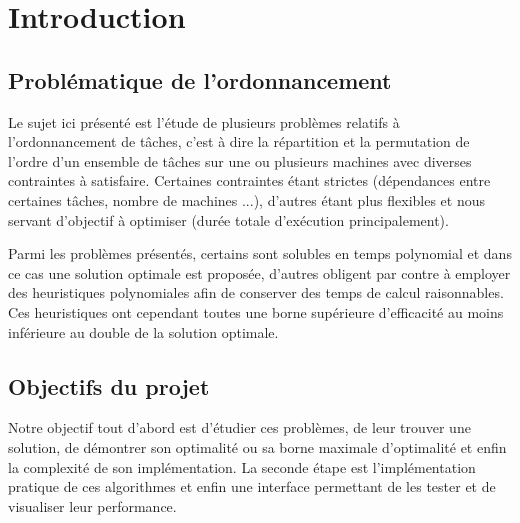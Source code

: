 \chapter{Introduction}
\section{Problématique de l'ordonnancement}
Le sujet ici présenté est l'étude de plusieurs problèmes relatifs à
l'ordonnancement de tâches, c'est à dire la répartition et la permutation de
l'ordre d'un ensemble de tâches sur une ou plusieurs machines avec diverses
contraintes à satisfaire. Certaines contraintes étant strictes (dépendances entre
certaines tâches, nombre de machines ...), d'autres étant plus flexibles et nous servant d'objectif à
optimiser (durée totale d'exécution principalement).

Parmi les problèmes
présentés, certains sont solubles en temps polynomial et dans ce cas une
solution optimale est proposée, d'autres obligent par contre à employer des heuristiques polynomiales afin de conserver des temps de calcul raisonnables. Ces heuristiques ont cependant toutes une borne supérieure d'efficacité au moins inférieure au double de la solution optimale.

\section{Objectifs du projet}
Notre objectif tout d'abord est d'étudier ces problèmes, de leur trouver une
solution, de démontrer son optimalité ou sa borne maximale d'optimalité et enfin
la complexité de son implémentation. La seconde étape est l'implémentation
pratique de ces algorithmes et enfin une interface permettant de les tester et
de visualiser leur performance.
